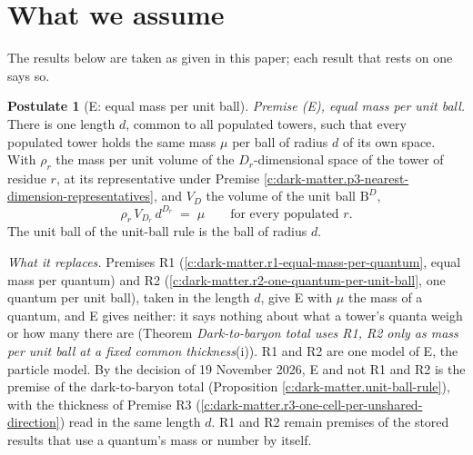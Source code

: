 \documentclass[11pt]{article}
\theoremstyle{definition}
\newtheorem{postulate}[theorem]{Postulate}
\theoremstyle{plain}
\providecommand{\B}{}\renewcommand{\B}{\mathrm{B}}
\begin{document}
\section*{What we assume}
The results below are taken as given in this paper; each result that rests on one says so.
\begin{postulate}[E: equal mass per unit ball]\label{c:dark-matter.e-equal-mass-per-unit-ball}
\emph{Premise (E), equal mass per unit ball.} There is one length $d$, common to all populated towers, such that every populated tower holds the same mass $\mu$ per ball of radius $d$ of its own space. With $\rho_{r}$ the mass per unit volume of the $D_{r}$-dimensional space of the tower of residue $r$, at its representative under Premise \ref{c:dark-matter.p3-nearest-dimension-representatives}, and $V_{D}$ the volume of the unit ball $\B^{D}$,
\[
\rho_{r}\,V_{D_{r}}\,d^{D_{r}} \;=\; \mu \qquad \text{for every populated } r .
\]
The unit ball of the unit-ball rule is the ball of radius $d$.

\emph{What it replaces.} Premises R1 (\ref{c:dark-matter.r1-equal-mass-per-quantum}, equal mass per quantum) and R2 (\ref{c:dark-matter.r2-one-quantum-per-unit-ball}, one quantum per unit ball), taken in the length $d$, give E with $\mu$ the mass of a quantum, and E gives neither: it says nothing about what a tower's quanta weigh or how many there are (Theorem \emph{Dark-to-baryon total uses R1, R2 only as mass per unit ball at a fixed common thickness}(i)). R1 and R2 are one model of E, the particle model. By the decision of 19 November 2026, E and not R1 and R2 is the premise of the dark-to-baryon total (Proposition \ref{c:dark-matter.unit-ball-rule}), with the thickness of Premise R3 (\ref{c:dark-matter.r3-one-cell-per-unshared-direction}) read in the same length $d$. R1 and R2 remain premises of the stored results that use a quantum's mass or number by itself.


\end{postulate}
\end{document}
